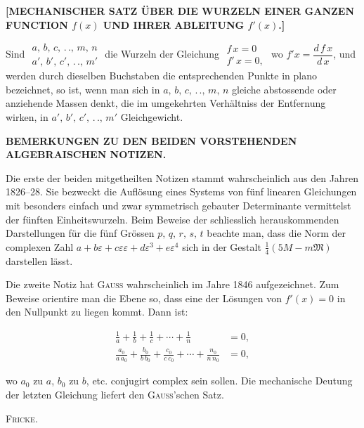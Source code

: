 \clearpage
{}

\begin{center}
\textbf{[MECHANISCHER SATZ ÜBER DIE WURZELN EINER GANZEN
FUNCTION $f(x)$ UND IHRER ABLEITUNG $f'(x)$.]}
\end{center}

\noindent\hspace*{\parindent}Sind $\begin{array}{c}a,\,b,\,c,\,.\,.,\,m,\,n\\ a',\,b',\,c',\,.\,.,\,m'\end{array}$ die
Wurzeln der Gleichung $\begin{array}{c}f\,x=0\\ f'\,x=0,\end{array}$ wo $f'x=\dfrac{d\,f\,x}{d\,x}$,
und werden durch dieselben Buchstaben die entsprechenden Punkte in plano bezeichnet, so ist, wenn
man sich in $a,\,b,\,c,\,.\,.,\,m,\,n$ gleiche abstossende oder anziehende Massen denkt, die im
umgekehrten Verhältniss der Entfernung wirken, in $a',\,b',\,c',\,.\,.,\,m'$ Gleichgewicht.

\begin{center}
\textbf{BEMERKUNGEN ZU DEN BEIDEN VORSTEHENDEN ALGEBRAISCHEN NOTIZEN.}
\end{center}

\noindent\hspace*{\parindent}Die erste der beiden mitgetheilten Notizen stammt wahrscheinlich aus den Jahren 1826--28. Sie
bezweckt die Auflösung eines Systems von fünf linearen Gleichungen mit besonders einfach und zwar
symmetrisch gebauter Determinante vermittelst der fünften Einheitswurzeln. Beim Beweise der
schliesslich herauskommenden Darstellungen für die fünf Grössen $p,\,q,\,r,\,s,\,t$ beachte man,
dass die Norm der complexen Zahl $a+b\varepsilon+c\varepsilon\varepsilon+d\varepsilon^3+e\varepsilon^4$
sich in der Gestalt $\frac{1}{4}(5M-m\mathfrak{M})$ darstellen lässt. 

Die zweite Notiz hat \textsc{Gauss} wahrscheinlich im Jahre 1846 aufgezeichnet. Zum Beweise
orientire man die Ebene so, dass eine der Lösungen von $f'(x)=0$ in den Nullpunkt zu liegen kommt.
Dann ist:

\[
\begin{aligned}
\frac{1}{a}+\frac{1}{b}+\frac{1}{c}+\cdots+\frac{1}{n}&=0,\\[3pt]
\frac{a_0}{a\,a_0}+\frac{b_0}{b\,b_0}+\frac{c_0}{c\,c_0}+\cdots+\frac{n_0}{n\,n_0}&=0,
\end{aligned}
\]

\noindent wo $a_0$ zu $a$, $b_0$ zu $b$, etc. conjugirt complex sein sollen. Die mechanische Deutung der
letzten Gleichung liefert den \textsc{Gauss}’schen Satz.
\par\nobreak\hfill\textsc{Fricke.}\par

